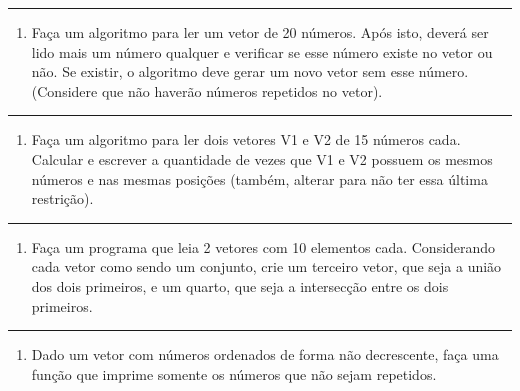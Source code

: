 \documentclass[12pt,a4paper]{article}
\renewcommand{\linethickness}{0.05em}
\providecommand{\tightlist}{%
      \setlength{\itemsep}{0pt}\setlength{\parskip}{0pt}}
\begin{document}
    \begin{center}\rule{0.5\linewidth}{\linethickness}\end{center}

\begin{enumerate}
\def\labelenumi{\arabic{enumi}.}
\setcounter{enumi}{10}
\tightlist
\item
  Faça um algoritmo para ler um vetor de 20 números. Após isto, deverá
  ser lido mais um número qualquer e verificar se esse número existe no
  vetor ou não. Se existir, o algoritmo deve gerar um novo vetor sem
  esse número. (Considere que não haverão números repetidos no vetor).
\end{enumerate}

    \begin{center}\rule{0.5\linewidth}{\linethickness}\end{center}

\begin{enumerate}
\def\labelenumi{\arabic{enumi}.}
\setcounter{enumi}{11}
\tightlist
\item
  Faça um algoritmo para ler dois vetores V1 e V2 de 15 números cada.
  Calcular e escrever a quantidade de vezes que V1 e V2 possuem os
  mesmos números e nas mesmas posições (também, alterar para não ter
  essa última restrição).
\end{enumerate}

    \begin{center}\rule{0.5\linewidth}{\linethickness}\end{center}

\begin{enumerate}
\def\labelenumi{\arabic{enumi}.}
\setcounter{enumi}{12}
\tightlist
\item
  Faça um programa que leia 2 vetores com 10 elementos cada.
  Considerando cada vetor como sendo um conjunto, crie um terceiro
  vetor, que seja a união dos dois primeiros, e um quarto, que seja a
  intersecção entre os dois primeiros.
\end{enumerate}

    \begin{center}\rule{0.5\linewidth}{\linethickness}\end{center}

\begin{enumerate}
\def\labelenumi{\arabic{enumi}.}
\setcounter{enumi}{13}
\tightlist
\item
  Dado um vetor com números ordenados de forma não decrescente, faça uma
  função que imprime somente os números que não sejam repetidos.
\end{enumerate}
\end{document}
